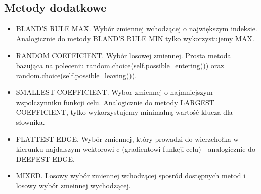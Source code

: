 \documentclass[a4paper]{article}
\begin{document}
\subsection{Metody dodatkowe}
\begin{itemize}
\item BLAND'S RULE MAX. Wybór zmiennej wchodzącej o największym indeksie. Analogicznie do metody BLAND'S RULE MIN tylko wykorzystujemy MAX.
\item RANDOM COEFFICIENT. Wybór losowej zmiennej. Prosta metoda bazująca na poleceniu random.choice(self.possible\_entering()) oraz random.choice(self.possible\_leaving()).
\item SMALLEST COEFFICIENT. Wybor zmiennej o najmniejszym wspolczynniku funkcji celu. Analogicznie do metody LARGEST COEFFICIENT, tylko wykorzystujemy minimalną wartość klucza dla słownika.
\item FLATTEST EDGE. Wybór zmiennej, który prowadzi do wierzchołka w kierunku najdalszym wektorowi c (gradientowi funkcji celu) - analogicznie do DEEPEST EDGE.
\item MIXED. Losowy wybór zmiennej wchodzącej sposród dostępnych metod i losowy wybór zmeinnej wychodzącej.
\end{itemize}
\end{document}
